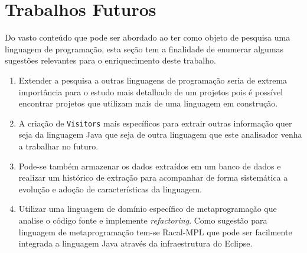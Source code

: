 

\section{Trabalhos Futuros}
Do vasto conte\'{u}do que pode ser abordado ao ter como objeto de pesquisa uma linguagem de programa\c{c}\~{a}o,  esta se\c{c}\~{a}o tem a finalidade de enumerar algumas sugest\~{o}es relevantes para o enriquecimento deste trabalho.

\begin{enumerate}
	\item Extender a pesquisa a outras linguagens de programa\c{c}\~{a}o seria de extrema import\^{a}ncia para o estudo mais detalhado de um projetos pois \'{e} poss\'{i}vel encontrar projetos que utilizam mais de uma linguagem em constru\c{c}\~{a}o.

	\item A cria\c{c}\~{a}o de \texttt{Visitors} mais espec\'{i}ficos para extrair outras informa\c{c}\~{a}o quer seja da linguagem Java que seja de outra linguagem que este analisador venha a trabalhar no futuro.

	\item Pode-se tamb\'{e}m armazenar os dados extra\'{i}dos em um banco de dados e realizar um hist\'{o}rico de extra\c{c}\~{a}o para acompanhar de forma sistem\'{a}tica a evolu\c{c}\~{a}o e ado\c{c}\~{a}o de caracter\'{i}sticas da linguagem.

	\item Utilizar uma linguagem de dom\'{i}nio espec\'{i}fico de metaprograma\c{c}\~{a}o que analise o c\'{o}digo fonte e implemente \textit{refactoring}. Como sugest\~{a}o para linguagem de metaprograma\c{c}\~{a}o tem-se Racal-MPL que pode ser facilmente integrada a linguagem Java atrav\'{e}s da infraestrutura do Eclipse.

\end{enumerate}


